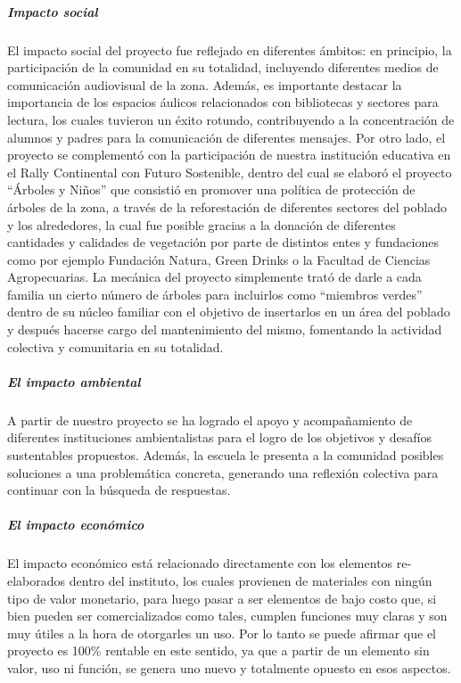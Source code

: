 \documentclass[
]{article}
\begin{document}
\hypertarget{impacto-social}{%
\subparagraph{Impacto social}\label{impacto-social}}

El impacto social del proyecto fue reflejado en diferentes ámbitos: en
principio, la participación de la comunidad en su totalidad, incluyendo
diferentes medios de comunicación audiovisual de la zona. Además, es
importante destacar la importancia de los espacios áulicos relacionados
con bibliotecas y sectores para lectura, los cuales tuvieron un éxito
rotundo, contribuyendo a la concentración de alumnos y padres para la
comunicación de diferentes mensajes. Por otro lado, el proyecto se
complementó con la participación de nuestra institución educativa en el
Rally Continental con Futuro Sostenible, dentro del cual se elaboró el
proyecto ``Árboles y Niños'' que consistió en promover una política de
protección de árboles de la zona, a través de la reforestación de
diferentes sectores del poblado y los alrededores, la cual fue posible
gracias a la donación de diferentes cantidades y calidades de vegetación
por parte de distintos entes y fundaciones como por ejemplo Fundación
Natura, Green Drinks o la Facultad de Ciencias Agropecuarias. La
mecánica del proyecto simplemente trató de darle a cada familia un
cierto número de árboles para incluirlos como ``miembros verdes'' dentro
de su núcleo familiar con el objetivo de insertarlos en un área del
poblado y después hacerse cargo del mantenimiento del mismo, fomentando
la actividad colectiva y comunitaria en su totalidad.

\hypertarget{el-impacto-ambiental}{%
\subparagraph{El impacto ambiental}\label{el-impacto-ambiental}}

A partir de nuestro proyecto se ha logrado el apoyo y acompañamiento de
diferentes instituciones ambientalistas para el logro de los objetivos y
desafíos sustentables propuestos. Además, la escuela le presenta a la
comunidad posibles soluciones a una problemática concreta, generando una
reflexión colectiva para continuar con la búsqueda de respuestas.

\hypertarget{el-impacto-econuxf3mico}{%
\subparagraph{El impacto económico}\label{el-impacto-econuxf3mico}}

El impacto económico está relacionado directamente con los elementos
re-elaborados dentro del instituto, los cuales provienen de materiales
con ningún tipo de valor monetario, para luego pasar a ser elementos de
bajo costo que, si bien pueden ser comercializados como tales, cumplen
funciones muy claras y son muy útiles a la hora de otorgarles un uso.
Por lo tanto se puede afirmar que el proyecto es 100\% rentable en este
sentido, ya que a partir de un elemento sin valor, uso ni función, se
genera uno nuevo y totalmente opuesto en esos aspectos.
\end{document}
